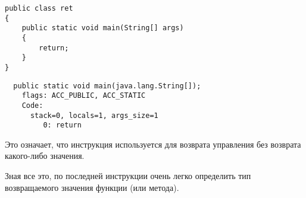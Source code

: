 \begin{lstlisting}[style=customjava]
public class ret
{
	public static void main(String[] args) 
	{
		return;
	}
}
\end{lstlisting}

\begin{lstlisting}
  public static void main(java.lang.String[]);
    flags: ACC_PUBLIC, ACC_STATIC
    Code:
      stack=0, locals=1, args_size=1
         0: return        
\end{lstlisting}

Это означает, что инструкция  используется для возврата управления 
без возврата какого-либо значения.

Зная все это, по последней инструкции очень легко определить тип возвращаемого 
значения функции (или метода).
